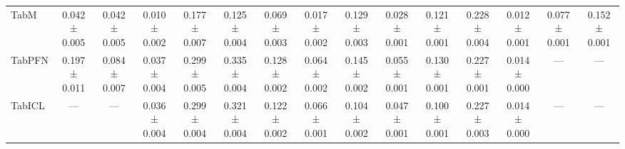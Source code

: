 \begin{table}[H]
{\begin{tabular}{lcccccccccccccc}
    TabM & 0.042 ± 0.005 & 0.042 ± 0.005 & 0.010 ± 0.002 & 0.177 ± 0.007 & 0.125 ± 0.004 & 0.069 ± 0.003 & 0.017 ± 0.002 & 0.129 ± 0.003 & 0.028 ± 0.001 & 0.121 ± 0.001 & 0.228 ± 0.004 & 0.012 ± 0.001 & 0.077 ± 0.001 & 0.152 ± 0.001 \\
    TabPFN & 0.197 ± 0.011 & 0.084 ± 0.007 & 0.037 ± 0.004 & 0.299 ± 0.005 & 0.335 ± 0.004 & 0.128 ± 0.002 & 0.064 ± 0.002 & 0.145 ± 0.002 & 0.055 ± 0.001 & 0.130 ± 0.001 & 0.227 ± 0.001 & 0.014 ± 0.000 & — & — \\
    TabICL & — & — & 0.036 ± 0.004 & 0.299 ± 0.004 & 0.321 ± 0.004 & 0.122 ± 0.002 & 0.066 ± 0.001 & 0.104 ± 0.002 & 0.047 ± 0.001 & 0.100 ± 0.001 & 0.227 ± 0.003 & 0.014 ± 0.000 & — & — \\
    \bottomrule
\end{tabular}
    }
\end{table}
